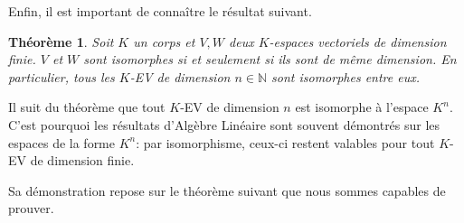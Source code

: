 \documentclass[oneside,12pt,french,table]{book}
\newcommand{\N}{\mathbb{N}}
\newtheorem{theorem}{Théorème}[section]
\theoremstyle{definition}
\theoremstyle{definition}
\theoremstyle{definition}
\begin{document}
\par
Enfin, il est important de connaître le résultat suivant.
\begin{theorem}
    Soit $K$ un corps et $V,W$ deux $K$-espaces vectoriels de dimension finie. $V$ et $W$ sont isomorphes si et seulement si ils sont de même dimension.    En particulier, tous les $K$-EV de dimension $n \in \N$ sont isomorphes entre eux.
\end{theorem}
\par
Il suit du théorème que tout $K$-EV de dimension $n$ est isomorphe à l'espace $K^n$. C'est pourquoi les résultats d'Algèbre Linéaire sont souvent démontrés sur les espaces de la forme $K^n$: par isomorphisme, ceux-ci restent valables pour tout $K$-EV de dimension finie.
\par
Sa démonstration repose sur le théorème suivant que nous sommes capables de prouver.
\end{document}
